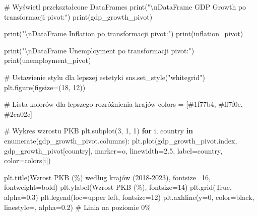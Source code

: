 \documentclass[
  polish,
  letterpaper,
  DIV=11,
  numbers=noendperiod]{scrreprt}
\newenvironment{Shaded}{\begin{snugshade}}{\end{snugshade}}
\newcommand{\BuiltInTok}[1]{\textcolor[rgb]{0.00,0.23,0.31}{#1}}
\newcommand{\CharTok}[1]{\textcolor[rgb]{0.13,0.47,0.30}{#1}}
\newcommand{\CommentTok}[1]{\textcolor[rgb]{0.37,0.37,0.37}{#1}}
\newcommand{\ControlFlowTok}[1]{\textcolor[rgb]{0.00,0.23,0.31}{\textbf{#1}}}
\newcommand{\DecValTok}[1]{\textcolor[rgb]{0.68,0.00,0.00}{#1}}
\newcommand{\FloatTok}[1]{\textcolor[rgb]{0.68,0.00,0.00}{#1}}
\newcommand{\KeywordTok}[1]{\textcolor[rgb]{0.00,0.23,0.31}{\textbf{#1}}}
\newcommand{\NormalTok}[1]{\textcolor[rgb]{0.00,0.23,0.31}{#1}}
\newcommand{\OperatorTok}[1]{\textcolor[rgb]{0.37,0.37,0.37}{#1}}
\newcommand{\StringTok}[1]{\textcolor[rgb]{0.13,0.47,0.30}{#1}}
\newcommand{\VariableTok}[1]{\textcolor[rgb]{0.07,0.07,0.07}{#1}}
\begin{document}
\begin{Shaded}
\begin{Highlighting}[]
\CommentTok{\# Wyświetl przekształcone DataFrames}
\BuiltInTok{print}\NormalTok{(}\StringTok{"}\CharTok{\textbackslash{}n}\StringTok{DataFrame GDP Growth po transformacji pivot:"}\NormalTok{)}
\BuiltInTok{print}\NormalTok{(gdp\_growth\_pivot)}

\BuiltInTok{print}\NormalTok{(}\StringTok{"}\CharTok{\textbackslash{}n}\StringTok{DataFrame Inflation po transformacji pivot:"}\NormalTok{)}
\BuiltInTok{print}\NormalTok{(inflation\_pivot)}

\BuiltInTok{print}\NormalTok{(}\StringTok{"}\CharTok{\textbackslash{}n}\StringTok{DataFrame Unemployment po transformacji pivot:"}\NormalTok{)}
\BuiltInTok{print}\NormalTok{(unemployment\_pivot)}

\CommentTok{\# Ustawienie stylu dla lepszej estetyki}
\NormalTok{sns.set\_style(}\StringTok{"whitegrid"}\NormalTok{)}
\NormalTok{plt.figure(figsize}\OperatorTok{=}\NormalTok{(}\DecValTok{18}\NormalTok{, }\DecValTok{12}\NormalTok{))}

\CommentTok{\# Lista kolorów dla lepszego rozróżnienia krajów}
\NormalTok{colors }\OperatorTok{=}\NormalTok{ [}\StringTok{\textquotesingle{}\#1f77b4\textquotesingle{}}\NormalTok{, }\StringTok{\textquotesingle{}\#ff7f0e\textquotesingle{}}\NormalTok{, }\StringTok{\textquotesingle{}\#2ca02c\textquotesingle{}}\NormalTok{]}

\CommentTok{\# Wykres wzrostu PKB}
\NormalTok{plt.subplot(}\DecValTok{3}\NormalTok{, }\DecValTok{1}\NormalTok{, }\DecValTok{1}\NormalTok{)}
\ControlFlowTok{for}\NormalTok{ i, country }\KeywordTok{in} \BuiltInTok{enumerate}\NormalTok{(gdp\_growth\_pivot.columns):}
\NormalTok{    plt.plot(gdp\_growth\_pivot.index, gdp\_growth\_pivot[country], marker}\OperatorTok{=}\StringTok{\textquotesingle{}o\textquotesingle{}}\NormalTok{, }
\NormalTok{             linewidth}\OperatorTok{=}\FloatTok{2.5}\NormalTok{, label}\OperatorTok{=}\NormalTok{country, color}\OperatorTok{=}\NormalTok{colors[i])}
    

\NormalTok{plt.title(}\StringTok{\textquotesingle{}Wzrost PKB (\%) według krajów (2018{-}2023)\textquotesingle{}}\NormalTok{, fontsize}\OperatorTok{=}\DecValTok{16}\NormalTok{, fontweight}\OperatorTok{=}\StringTok{\textquotesingle{}bold\textquotesingle{}}\NormalTok{)}
\NormalTok{plt.ylabel(}\StringTok{\textquotesingle{}Wzrost PKB (\%)\textquotesingle{}}\NormalTok{, fontsize}\OperatorTok{=}\DecValTok{14}\NormalTok{)}
\NormalTok{plt.grid(}\VariableTok{True}\NormalTok{, alpha}\OperatorTok{=}\FloatTok{0.3}\NormalTok{)}
\NormalTok{plt.legend(loc}\OperatorTok{=}\StringTok{\textquotesingle{}upper left\textquotesingle{}}\NormalTok{, fontsize}\OperatorTok{=}\DecValTok{12}\NormalTok{)}
\NormalTok{plt.axhline(y}\OperatorTok{=}\DecValTok{0}\NormalTok{, color}\OperatorTok{=}\StringTok{\textquotesingle{}black\textquotesingle{}}\NormalTok{, linestyle}\OperatorTok{=}\StringTok{\textquotesingle{}{-}\textquotesingle{}}\NormalTok{, alpha}\OperatorTok{=}\FloatTok{0.2}\NormalTok{)  }\CommentTok{\# Linia na poziomie 0\%}


\end{Highlighting}
\end{Shaded}
\end{document}

